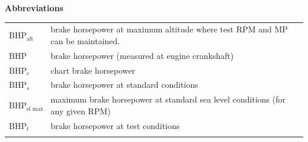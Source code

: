 \documentclass[
]{book}
\begin{document}
\textbf{Abbreviations}

\begin{longtable}[]{@{}ll@{}}
\toprule
\endhead
\begin{minipage}[t]{0.13\columnwidth}\raggedright
\(\mathrm{BHP}_{\text{alt}}\)\strut
\end{minipage} & \begin{minipage}[t]{0.81\columnwidth}\raggedright
brake horsepower at maximum altitude where test RPM and MP can be maintained.\strut
\end{minipage}\tabularnewline
\begin{minipage}[t]{0.13\columnwidth}\raggedright
\(\mathrm{BHP}\)\strut
\end{minipage} & \begin{minipage}[t]{0.81\columnwidth}\raggedright
brake horsepower (measured at engine crankshaft)\strut
\end{minipage}\tabularnewline
\begin{minipage}[t]{0.13\columnwidth}\raggedright
\(\mathrm{BHP}_{c}\)\strut
\end{minipage} & \begin{minipage}[t]{0.81\columnwidth}\raggedright
chart brake horsepower\strut
\end{minipage}\tabularnewline
\begin{minipage}[t]{0.13\columnwidth}\raggedright
\(\mathrm{BHP}_{s}\)\strut
\end{minipage} & \begin{minipage}[t]{0.81\columnwidth}\raggedright
brake horsepower at standard conditions\strut
\end{minipage}\tabularnewline
\begin{minipage}[t]{0.13\columnwidth}\raggedright
\(\mathrm{BHP}_{\text{sl max}}\)\strut
\end{minipage} & \begin{minipage}[t]{0.81\columnwidth}\raggedright
maximum brake horsepower at standard sea level conditions (for any given RPM)\strut
\end{minipage}\tabularnewline
\begin{minipage}[t]{0.13\columnwidth}\raggedright
\(\mathrm{BHP}_{t}\)\strut
\end{minipage} & \begin{minipage}[t]{0.81\columnwidth}\raggedright
brake horsepower at test conditions\strut
\end{minipage}\tabularnewline
\begin{minipage}[t]{0.13\columnwidth}\raggedright

\end{minipage}
\end{longtable}
\end{document}
